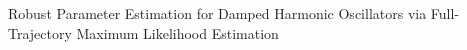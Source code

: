 \documentclass[]{article}
\begin{document}
Robust Parameter Estimation for Damped Harmonic Oscillators via Full-Trajectory Maximum Likelihood Estimation
\end{document}
